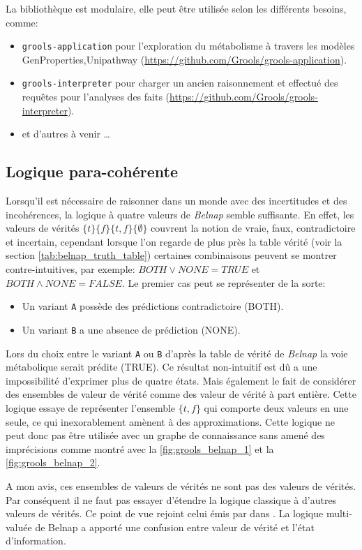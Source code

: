 \begin{refsegment}
La bibliothèque est modulaire, elle peut être utilisée selon les différents besoins, comme:\nolisttopbreak
\begin{itemize}
	\item \texttt{grools-application} pour l'exploration du métabolisme à travers les modèles GenProperties,Unipathway  (\url{https://github.com/Grools/grools-application}).
	\item \texttt{grools-interpreter} pour charger un ancien raisonnement et effectué des requêtes pour l'analyses des faits (\url{https://github.com/Grools/grools-interpreter}).
	\item et d'autres à venir \ldots
\end{itemize}

\subsection{Logique para-cohérente}
Lorsqu'il est nécessaire de raisonner dans un monde avec des incertitudes et des incohérences, la logique à quatre valeurs de \textit{Belnap} semble suffisante. En effet, les valeurs de vérités $\{t\} \{f\} \{t,f\} \{\emptyset\}$ couvrent la notion de vraie, faux, contradictoire et incertain, cependant lorsque l'on regarde de plus près la table vérité  (voir la section   \cref{tab:belnap_truth_table}) certaines combinaisons peuvent se montrer contre-intuitives, par exemple: $ BOTH \lor  NONE = TRUE$ et $ BOTH \land NONE = FALSE$. Le premier cas  peut se représenter de la sorte: 
\begin{itemize}
    \item Un variant \texttt{A} possède des prédictions contradictoire (BOTH).
    \item Un variant \texttt{B} a une absence de prédiction (NONE).
\end{itemize}
Lors du choix entre le variant \texttt{A} ou \texttt{B} d'après la table de vérité de \textit{Belnap} la voie métabolique serait prédite (TRUE). Ce résultat non-intuitif est dû a une impossibilité d'exprimer plus de quatre états. Mais également le fait de considérer des ensembles de valeur de vérité comme des valeur de vérité à part entière. Cette logique essaye de représenter l'ensemble $\{t,f\}$ qui comporte deux valeurs en une seule, ce qui inexorablement amènent à des approximations. Cette logique ne peut donc pas être utilisée avec un graphe de connaissance sans amené des  imprécisions comme montré avec la \cref{fig:grools_belnap_1} et la  \cref{fig:grools_belnap_2}. 

A mon avis, ces ensembles de valeurs de vérités ne sont pas des valeurs de vérités. Par conséquent il ne faut pas essayer d'étendre la logique classique à d'autres valeurs de vérités. Ce point de vue rejoint celui émis par \citeauthor{dubois2008ignorance} dans \cite{dubois2008ignorance}. La logique multi-valuée de Belnap a apporté une confusion entre valeur de vérité et l'état d'information.



\subbibliography
\end{refsegment}